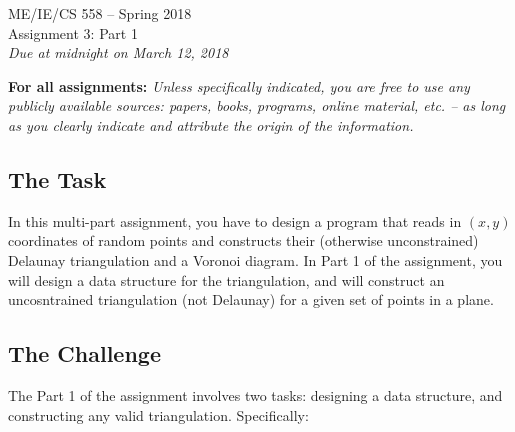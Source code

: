 \documentclass[11pt]{article}
\begin{document}
\begin{center}
{\Large ME/IE/CS 558 -- Spring 2018}\\ \vspace{12pt} {\large
Assignment 3:  Part 1}\\ \vspace{12pt} {\em Due at midnight on March 12, 2018}
\end{center}

{\bf For all assignments:} {\em Unless specifically indicated, you
are free to use any publicly available sources: papers, books,
programs, online material, etc. -- as long as you clearly indicate
and attribute the origin of the information.}

\subsection*{The Task}

In this multi-part assignment, you have to design a program that reads in
$(x,y)$ coordinates of random points and constructs their (otherwise 
unconstrained) Delaunay triangulation and a Voronoi diagram.  
In Part 1 of the assignment, you will design a data structure for the triangulation, 
and will construct an uncosntrained triangulation (not Delaunay) for a given set of points in a plane.  

\subsection*{The Challenge}

The Part 1 of the assignment involves two tasks:  designing a data structure, and 
constructing any valid triangulation.  Specifically:
\end{document}
